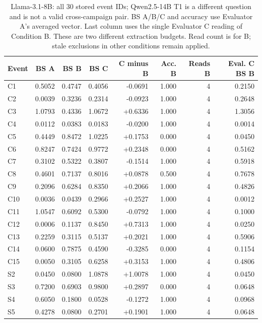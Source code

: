 \begin{table}[!htbp]
\centering\small
\caption{Llama-3.1-8B: all 30 stored event IDs; Qwen2.5-14B T1 is a different question and is not a valid cross-campaign pair. BS A/B/C and accuracy use Evaluator A's averaged vector. Last column uses the single Evaluator C reading of Condition B. These are two different extraction budgets. Read count is for B; stale exclusions in other conditions remain applied.}
\label{tab:full_events_llama318b}
\begin{tabular}{lrrrrrrr}
\toprule
Event & BS A & BS B & BS C & C minus B & Acc. B & Reads B & Eval. C BS B \\
\midrule
C1 & 0.5052 & 0.4747 & 0.4056 & -0.0691 & 1.000 & 4 & 0.2150 \\
C2 & 0.0039 & 0.3236 & 0.2314 & -0.0923 & 1.000 & 4 & 0.2648 \\
C3 & 1.0793 & 0.4336 & 1.0672 & +0.6336 & 1.000 & 4 & 1.3056 \\
C4 & 0.0112 & 0.0383 & 0.0183 & -0.0200 & 1.000 & 4 & 0.0014 \\
C5 & 0.4449 & 0.8472 & 1.0225 & +0.1753 & 0.000 & 4 & 0.0450 \\
C6 & 0.8247 & 0.7424 & 0.9772 & +0.2348 & 0.000 & 4 & 0.5162 \\
C7 & 0.3102 & 0.5322 & 0.3807 & -0.1514 & 1.000 & 4 & 0.5918 \\
C8 & 0.4601 & 0.7137 & 0.8016 & +0.0878 & 0.500 & 4 & 0.7678 \\
C9 & 0.2096 & 0.6284 & 0.8350 & +0.2066 & 1.000 & 4 & 0.4826 \\
C10 & 0.0036 & 0.0439 & 0.2966 & +0.2527 & 1.000 & 4 & 0.0012 \\
C11 & 1.0547 & 0.6092 & 0.5300 & -0.0792 & 1.000 & 4 & 0.1000 \\
C12 & 0.0006 & 0.1137 & 0.8450 & +0.7313 & 1.000 & 4 & 0.0250 \\
C13 & 0.2259 & 0.3115 & 0.5137 & +0.2021 & 1.000 & 4 & 0.5906 \\
C14 & 0.0600 & 0.7875 & 0.4590 & -0.3285 & 0.000 & 4 & 0.1154 \\
C15 & 0.0050 & 0.3105 & 0.6258 & +0.3153 & 1.000 & 4 & 0.4806 \\
S2 & 0.0450 & 0.0800 & 1.0878 & +1.0078 & 1.000 & 4 & 0.0450 \\
S3 & 0.7200 & 0.6903 & 0.9800 & +0.2897 & 0.000 & 4 & 0.0648 \\
S4 & 0.6050 & 0.1800 & 0.0528 & -0.1272 & 1.000 & 4 & 0.0968 \\
S5 & 0.4278 & 0.0800 & 0.2701 & +0.1901 & 1.000 & 4 & 0.0648 \\

\end{tabular}
\end{table}
